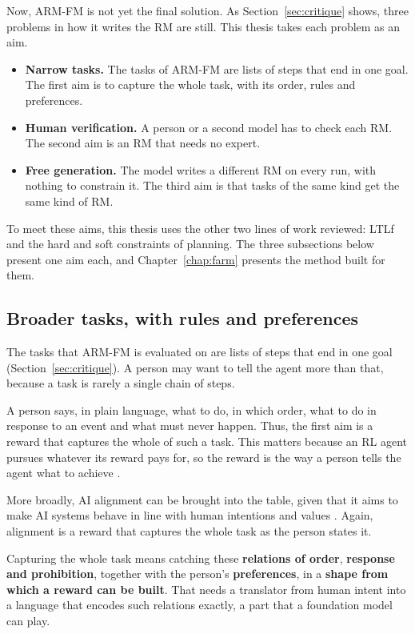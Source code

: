 \documentclass[11pt,english,listoffigures,listoftables]{tfgetsinf}
\begin{document}
Now, ARM-FM is not yet the final solution. As Section~\ref{sec:critique} shows, three problems in how it writes the RM are still. This thesis takes each problem as an aim.

\begin{itemize}
    \item \textbf{Narrow tasks.} The tasks of ARM-FM are lists of steps that end in one goal. The first aim is to capture the whole task, with its order, rules and preferences.
    \item \textbf{Human verification.} A person or a second model has to check each RM. The second aim is an RM that needs no expert.
    \item \textbf{Free generation.} The model writes a different RM on every run, with nothing to constrain it. The third aim is that tasks of the same kind get the same kind of RM.
\end{itemize}

To meet these aims, this thesis uses the other two lines of work reviewed: LTLf and the hard and soft constraints of planning. The three subsections below present one aim each, and Chapter~\ref{chap:farm} presents the method built for them.

\subsection{Broader tasks, with rules and preferences}
The tasks that ARM-FM is evaluated on are lists of steps that end in one goal (Section~\ref{sec:critique}). A person may want to tell the agent more than that, because a task is rarely a single chain of steps. 

A person says, in plain language, what to do, in which order, what to do in response to an event and what must never happen. Thus, the first aim is a reward that captures the whole of such a task. This matters because an RL agent pursues whatever its reward pays for, so the reward is the way a person tells the agent what to achieve \cite{sutton2018reinforcement}. 

More broadly, AI alignment can be brought into the table, given that it aims to make AI systems behave in line with human intentions and values \cite{ji2025alignment}. Again, alignment is a reward that captures the whole task as the person states it.

Capturing the whole task means catching these \textbf{relations of order}, \textbf{response and prohibition}, together with the person's \textbf{preferences}, in a \textbf{shape from which a reward can be built}. That needs a translator from human intent into a language that encodes such relations exactly, a part that a foundation model can play.
\end{document}
